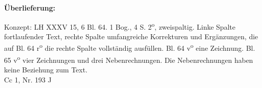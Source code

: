       
               
                \begin{ledgroupsized}[r]{120mm}
                \footnotesize 
                \pstart                
                \noindent\textbf{\"{U}berlieferung:}   
                \pend
                \end{ledgroupsized}
            
              
                            \begin{ledgroupsized}[r]{114mm}
                            \footnotesize 
                            \pstart \parindent -6mm
                            Konzept: LH XXXV 15, 6 Bl. 64. 1 Bog., 4 S.
                2\textsuperscript{o}, zweispaltig. Linke Spalte fortlaufender Text, rechte Spalte
                umfangreiche Korrekturen und Erg\"{a}nzungen, die auf Bl. 64 r\textsuperscript{o} die
                rechte Spalte vollst\"{a}ndig ausf\"{u}llen. Bl. 64 v\textsuperscript{o} eine
                Zeichnung. Bl. 65 v\textsuperscript{o} vier Zeichnungen und drei Nebenrechnungen. Die
                Nebenrechnungen haben keine Beziehung zum Text.\\Cc 1, Nr. 193 J \pend
                            \end{ledgroupsized}
                \vspace*{8mm}
                \pstart 
                \normalsize
